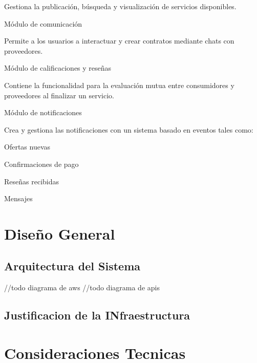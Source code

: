 \documentclass{article}
\begin{document}
      Gestiona la publicación, búsqueda y visualización de servicios disponibles. 

      Módulo de comunicación  

      Permite a los usuarios a interactuar y crear contratos mediante chats con proveedores. 

      Módulo de calificaciones y reseñas   

      Contiene la funcionalidad para la evaluación mutua entre consumidores y proveedores al finalizar un servicio.  

      Módulo de notificaciones  

      Crea y gestiona las notificaciones con un sistema basado en eventos tales como: 

      Ofertas nuevas 

      Confirmaciones de pago 

      Reseñas recibidas  

      Mensajes 
      
\section{Dise\~no General}
  
  \subsection{Arquitectura del Sistema}
  //todo diagrama de aws
  //todo diagrama de apis
  \subsection{Justificacion de la INfraestructura}

\section{Consideraciones Tecnicas}
\newpage
\end{document}
